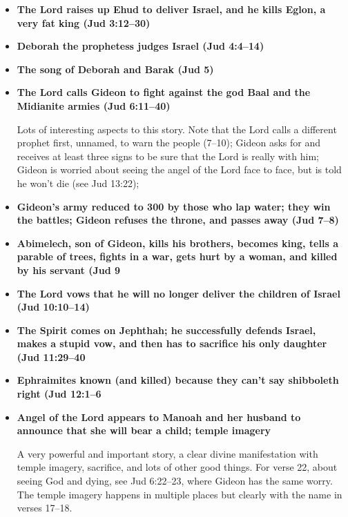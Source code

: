 \begin{itemize}
\item \textbf{The Lord raises up Ehud to deliver Israel, and he kills Eglon, a very fat king (Jud 3:12--30)}

\item \textbf{Deborah the prophetess judges Israel (Jud 4:4--14)}

\item \textbf{The song of Deborah and Barak (Jud 5)}

\item \textbf{The Lord calls Gideon to fight against the god Baal and the Midianite armies (Jud 6:11--40)}

	Lots of interesting aspects to this story. Note that the Lord calls a different prophet first, unnamed, to warn the people (7--10); Gideon asks for and receives at least three signs to be sure that the Lord is really with him; Gideon is worried about seeing the angel of the Lord face to face, but is told he won't die (see Jud 13:22);

\item \textbf{Gideon's army reduced to 300 by those who lap water; they win the battles; Gideon refuses the throne, and passes away (Jud 7--8)}

\item \textbf{Abimelech, son of Gideon, kills his brothers, becomes king, tells a parable of trees, fights in a war, gets hurt by a woman, and killed by his servant (Jud 9}

\item \textbf{The Lord vows that he will no longer deliver the children of Israel (Jud 10:10--14)}

\item \textbf{The Spirit comes on Jephthah; he successfully defends Israel, makes a stupid vow, and then has to sacrifice his only daughter (Jud 11:29--40}

\item \textbf{Ephraimites known (and killed) because they can't say shibboleth right (Jud 12:1--6}

\item \textbf{Angel of the Lord appears to Manoah and her husband to announce that she will bear a child; temple imagery}

	A very powerful and important story, a clear divine manifestation with temple imagery, sacrifice, and lots of other good things. For verse 22, about seeing God and dying, see Jud 6:22--23, where Gideon has the same worry. The temple imagery happens in multiple places but clearly with the name in verses 17--18.


\end{itemize}
